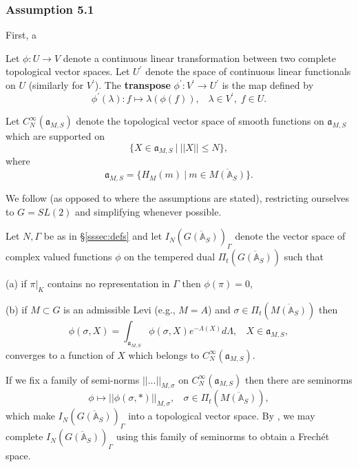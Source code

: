 \subsubsection{Assumption 5.1}\label{sssec:ass51}

First, a

\begin{definition}\label{defn:6.2}
Let $\phi :U\rightarrow V$ denote a continuous linear transformation between
two complete topological vector spaces. Let $U^{\prime }$ denote the space
of continuous linear functionals on $U$ (similarly for $V^{\prime }$). The 
{\bf transpose} $\phi ^{\prime }:V^{\prime }\rightarrow U^{\prime }$ is the
map defined by 
\[
\phi ^{\prime }(\lambda ):f\longmapsto \lambda (\phi (f)),\;\;\;\lambda \in
V^{\prime },\;f\in U. 
\]
\end{definition}

Let $C_N^\infty({\mathfrak{a}}_{M,S})$ denote the topological vector space of
smooth functions on ${\mathfrak{a}}_{M,S}$ which are supported on
\[
\{X\in {\mathfrak{a}}_{M,S}\ |\ ||X||\leq N\},
\]
where
\begin{equation}\label{eq:6.6}
{\mathfrak{a}}_{M,S}
=\{H_M(m)\ |\ m\in \overline{M({\mathbb{A}}_S)}\}.
\end{equation}

We follow \cite[section 11]{A11} (as opposed to \cite[sections 4,5]{A6} where
the assumptions are stated), restricting ourselves to
$G=SL(2)$ and simplifying whenever possible.

 Let $N,\Gamma$ be as in \S\ref{sssec:defs} and let
$I_N(\overline{G({\mathbb{A}}_S)})_\Gamma$ denote the vector
space of complex valued functions $\phi$
on the tempered dual $\Pi_t(\overline{G({\mathbb{A}}_S)})$ such
that

(a) if $\pi|_K$ contains no representation in $\Gamma$ then
$\phi (\pi)=0$,

(b) if $M\subset G$ is an admissible Levi (e.g., $M=A$) and
$\sigma\in \Pi_t(\overline{M({\mathbb{A}}_S)})$ then
\begin{equation}\label{eq:6.7}
\phi(\sigma,X)
=\int_{{\mathfrak{a}}_{M,S}}
\phi(\sigma,X)e^{-\Lambda (X)}d\Lambda ,\ \ \ \ X\in {\mathfrak{a}}_{M,S},
\end{equation}
converges to a function of $X$ which belongs to
$C_N^\infty({\mathfrak{a}}_{M,S})$.

If we fix a family of semi-norms $||...||_{M,\sigma}$
on $C_N^\infty({\mathfrak{a}}_{M,S})$ then there are seminorms
\begin{equation}\label{eq:6.8}
\phi\longmapsto ||\phi(\sigma,*)||_{M,\sigma},\ \ \ \
\sigma\in \Pi_t(\overline{M({\mathbb{A}}_S)}),
\end{equation}
which make $I_N(\overline{G({\mathbb{A}}_S)})_\Gamma$ into a topological vector space.
By \cite[ch 1]{Ru}, we may complete
$I_N(\overline{G({\mathbb{A}}_S)})_\Gamma$ using this family of seminorms to
obtain a Frech\'et space.

